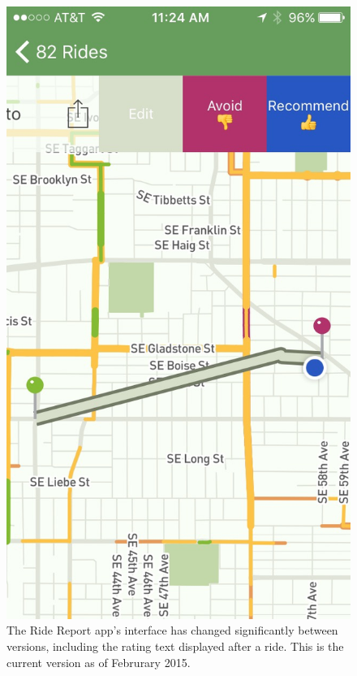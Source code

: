 \documentclass[12pt,twoside]{reedthesis}
\begin{document}
  \begin{figure}[tbh]
  \centering
  \includegraphics[angle = 0,scale = 0.35]{figure/ride_report_rating.jpg}
  \caption[The Ride Report app's interface has changed significantly between
  versions, including the rating text displayed after a ride. This is the current
  version as of Februrary 2015.]{\normalsize{The Ride Report app's interface has changed significantly between
  versions, including the rating text displayed after a ride. This is the current
  version as of Februrary 2015.}}
  \label{fig:ride-rating}
  \end{figure}
  
\end{document}
